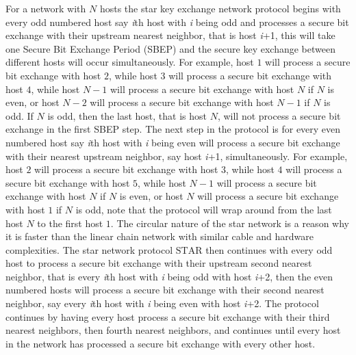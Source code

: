 \documentclass[a4paper,12pt,pdftex]{article}
\begin{document}
For a network with $N$ hosts the star key exchange network protocol begins with every odd numbered host say \textit{i}th host with \textit{i} being odd and processes a secure bit exchange with their upstream nearest neighbor, that is host \textit{i}+1, this will take one Secure Bit Exchange Period (SBEP) and the secure key exchange between different hosts will occur simultaneously. For example, host $1$ will process a secure bit exchange with host $2$, while host $3$ will process a secure bit exchange with host $4$, while host $N-1$ will process a secure bit exchange with host $N$ if $N$ is even, or host $N-2$ will process a secure bit exchange with host $N-1$ if $N$ is odd. If $N$ is odd, then the last host, that is host $N$, will not process a secure bit exchange in the first SBEP step. The next step in the protocol is for every even numbered host say \textit{i}th host with \textit{i} being even will process a secure bit exchange with their nearest upstream neighbor, say host \textit{i}+1, simultaneously. For example, host $2$ will process a secure bit exchange with host $3$, while host $4$ will process a secure bit exchange with host $5$, while host $N-1$ will process a secure bit exchange with host $N$ if $N$ is even, or host $N$ will process a secure bit exchange with host $1$ if $N$ is odd, note that the protocol will wrap around from the last host $N$ to the first host $1$. The circular nature of the star network is a reason why it is faster than the linear chain network with similar cable and hardware complexities. The star network protocol $\mathrm{STAR}$ then continues with every odd host to process a secure bit exchange with their upstream second nearest neighbor, that is every \textit{i}th host with \textit{i} being odd with host \textit{i}+2, then the even numbered hosts will process a secure bit exchange with their second nearest neighbor, say every \textit{i}th host with \textit{i} being even with host \textit{i}+2. The protocol continues by having every host process a secure bit exchange with their third nearest neighbors, then fourth nearest neighbors, and continues until every host in the network has processed a secure bit exchange with every other host.
\end{document}
